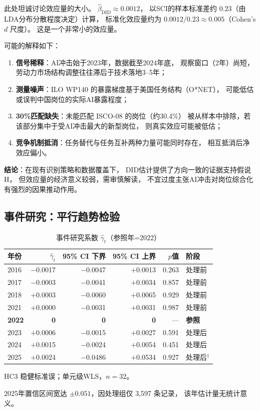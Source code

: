 \documentclass[12pt,a4paper]{ctexart}
\begin{document}
此处坦诚讨论效应量的大小。
$\hat{\beta}_{\text{DID}} \approx 0.0012$，
以SCI的样本标准差约 $0.23$（由LDA分布分散程度决定）计算，
标准化效应量约为 $0.0012 / 0.23 \approx 0.005$（Cohen's $d$ 尺度）。
这是一个非常小的效应量。

可能的解释如下：
\begin{enumerate}[label=(\arabic*)]
    \item \textbf{信号稀释}：AI冲击始于2023年，数据截至2024年底，
    观察窗口（2年）尚短，劳动力市场结构调整往往滞后于技术落地3--5年；
    \item \textbf{测量噪声}：ILO WP140 的暴露梯度基于美国任务结构（O*NET），
    可能低估或误判中国岗位的实际AI暴露程度；
    \item \textbf{30\%匹配缺失}：未能匹配 ISCO-08 的岗位（约30.4\%）
    被从样本中排除，若该部分集中于受AI冲击最大的新型岗位，
    则真实效应可能被低估；
    \item \textbf{竞争机制抵消}：任务替代与任务互补两种力量可能同时存在，
    相互抵消后净效应偏小。
\end{enumerate}

\textbf{结论}：在现有识别策略和数据覆盖下，
DID估计提供了方向一致的证据支持假说H，
但效应量的经济意义较弱，需审慎解读，
不宜过度主张AI冲击对岗位综合化有强烈的因果推动作用。

\subsection{事件研究：平行趋势检验}

\begin{table}[H]
\centering
\caption{事件研究系数 $\hat{\gamma}_t$（参照年=2022）}
\begin{threeparttable}
\begin{tabular}{lrrrrl}
\toprule
年份 & $\hat{\gamma}_t$ & 95\% CI 下界 & 95\% CI 上界 & $p$值 & 阶段 \\
\midrule
2016 & $-$0.0017 & $-$0.0047 & $+$0.0013 & 0.263 & 处理前 \\
2017 & $-$0.0003 & $-$0.0041 & $+$0.0034 & 0.857 & 处理前 \\
2018 & $+$0.0003 & $-$0.0060 & $+$0.0065 & 0.929 & 处理前 \\
2021 & $+$0.0000 & $-$0.0031 & $+$0.0031 & 0.987 & 处理前 \\
\textbf{2022} & \textbf{0} & \textbf{0} & \textbf{0} & --- & \textbf{参照} \\
2023 & $+$0.0006 & $-$0.0015 & $+$0.0027 & 0.591 & 处理后 \\
2024 & $+$0.0015 & $-$0.0024 & $+$0.0054 & 0.451 & 处理后 \\
2025 & $+$0.0024 & $-$0.0486 & $+$0.0534 & 0.927 & 处理后$^\dagger$ \\
\bottomrule
\end{tabular}
\begin{tablenotes}
\small
\item HC3 稳健标准误；单元级WLS，$n=32$。
\item[$\dagger$] 2025年置信区间宽达 $\pm 0.051$，因处理组仅 3,597 条记录，
该年估计量无统计意义。
\end{tablenotes}
\end{threeparttable}
\end{table}
\end{document}
